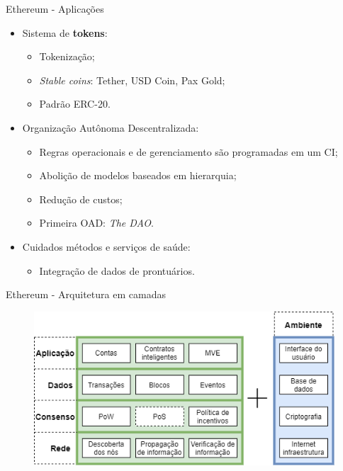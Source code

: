 \begin{frame}{Ethereum - Aplicações}
    \begin{itemize}
        \item Sistema de \textbf{tokens}:
        \begin{itemize}
            \item Tokenização;
            \item \textit{Stable coins}: Tether, USD Coin, Pax Gold;
            \item Padrão ERC-20.
        \end{itemize}
        \item Organização Autônoma Descentralizada:
        \begin{itemize}
            \item Regras operacionais e de gerenciamento são programadas em um CI;
            \item Abolição de modelos baseados em hierarquia;
            \item Redução de custos;
            \item Primeira OAD: \textit{The DAO}.
        \end{itemize}
        \item Cuidados métodos e serviços de saúde:
        \begin{itemize}
            \item Integração de dados de prontuários.
        \end{itemize}
    \end{itemize}
\end{frame}

\begin{frame}{Ethereum - Arquitetura em camadas}
    \begin{figure}[!htb]
     \centering
     \includegraphics[scale=0.5]{figuras/blockchain/ethereum_arquitetura.png}
    \end{figure}    
\end{frame}